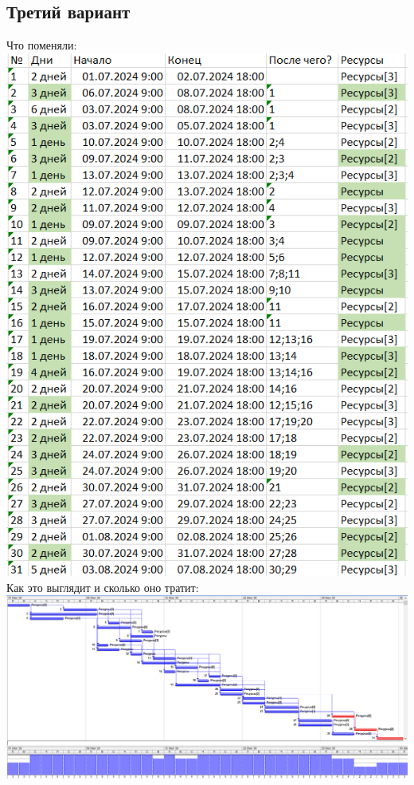 \documentclass[14pt]{article}
\begin{document}
	\subsection{Третий вариант}
		{\LARGE Что поменяли:}\\
		\includegraphics[height=0.6\textheight]{../img/1b3_days_change.png}\\ 
		{\LARGE Как это выглядит и сколько оно тратит:}\\
		\includegraphics[width=\textwidth]{../img/1b3_answer.png}\\ 
\end{document}
